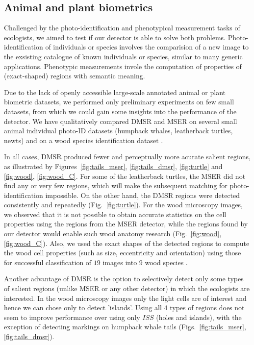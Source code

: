\documentclass[conference,compsoc]{IEEEtran}
\begin{document}
\subsection{Animal and plant biometrics}
\label{ssec:bio}
Challenged by the photo-identification and phenotypical measurement tasks of ecologists, we aimed to test if our detector is able to solve both problems. Photo-identification of individuals or species involves the comparision of a new image to the exsisting catalogue of known individuals or species, similar to many generic applications. Phenotypic measurements invole the computation of properties of (exact-shaped) regions with semantic meaning.

Due to the lack of openly accessible large-scale annotated animal or plant biometric datasets, we performed only preliminary experiments on few small datasets, from which we could gain some insights into the performance of the detector. We have qualitatively compared DMSR and MSER on several small animal individual photo-ID datasets (humpback whales, leatherback turtles, newts) and on a wood species identification dataset \cite{RangHumpb06, PauwelsZB08, wood}. 

In all cases, DMSR produced fewer and perceptually more acurate salient regions, as illustrated by Figures~\ref{fig:tails_mser}, \ref{fig:tails_dmsr}, \ref{fig:turtle} and \ref{fig:wood}, \ref{fig:wood_C}. For some of the leatherback turtles, the MSER did not find any or very few regions, which will make the subsequent matching for photo-identification impossible. On the other hand, the DMSR regions were detected consistently and repeatedly (Fig.~\ref{fig:turtle}). For the wood microscopy images, we observed that it is not possible to obtain accurate statistics on the cell properties using the regions from the MSER detector, while the regions found by our detector would enable such wood anatomy research (Fig.~\ref{fig:wood}, \ref{fig:wood_C}). Also, we used the exact shapes of the detected regions to compute the wood cell properties (such as size, eccentricity and orientation) using those for successful classification of $19$ images into $9$ wood species \cite{elena_ranguelova_wood}. 

Another advantage of DMSR is the option to selectively detect only some types of salient regions (unlike MSER or any other detector) in which the ecologists are interested. In the wood microscopy images only the light cells are of interest and hence we can chose only to detect 'islands'. Using all $4$ types of regions does not seem to improve performance over using only $ISS$ (holes and islands), with the exception of detecting markings on humpback whale tails (Figs.~\ref{fig:tails_mser}, \ref{fig:tails_dmsr}). 
\end{document}
